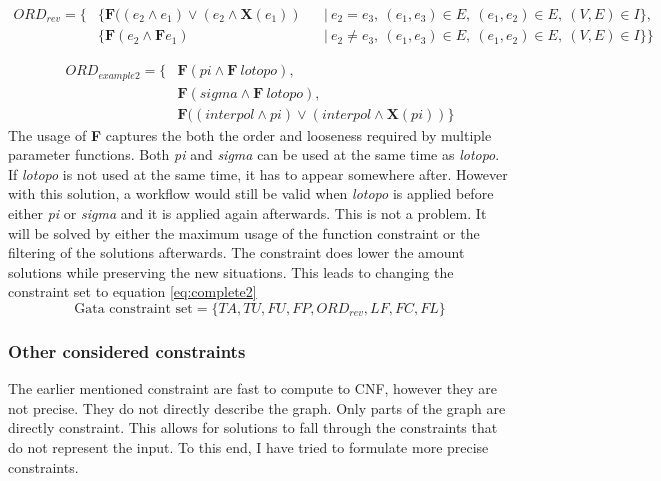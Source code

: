 \documentclass{article}
\begin{document}
\begin{align*}
        ORD_{rev} =\{& \{\textbf{F}((e_2 \wedge e_1) \vee (e_2 \wedge \textbf{X} (e_1)  )&  &|\ e_2 = e_3,\ (e_1,e_3) \in  E ,\ (e_1,e_2) \in  E ,\ (V,E) \in  I  \}, \\
        &\{\textbf{F}(e_2 \wedge \textbf{F} e_1) &  &|\ e_2 \not= e_3,\ (e_1,e_3) \in  E ,\ (e_1,e_2) \in  E,\    (V,E) \in I\}\}
\end{align*}

\begin{align*}
    ORD_{example2} = \{& \textbf{F}(pi \wedge \textbf{F}\ lotopo), \\
    & \textbf{F}(sigma \wedge \textbf{F}\ lotopo), \\
    &\textbf{F}((interpol \wedge pi) \vee (interpol \wedge \textbf{X} (pi)  ) 
    \}
\end{align*}
The usage of \textbf{F} captures the both the order and looseness required by multiple parameter functions. Both \textit{pi} and \textit{sigma} can be used at the same time as \textit{lotopo}. If \textit{lotopo} is not used at the same time, it has to appear somewhere after. However with this solution, a workflow would still be valid when \textit{lotopo} is applied before either \textit{pi} or \textit{sigma} and it is applied again afterwards. This is not a problem. It will be solved by either the maximum usage of the function constraint or the filtering of the solutions afterwards. The constraint does lower the amount solutions while preserving the new situations. This leads to changing the constraint set to equation \ref{eq:complete2}
\begin{equation}
 \text{Gata constraint set}= \{TA, TU, FU, FP, ORD_{rev}, LF, FC,FL\} \label{eq:complete2}
\end{equation}
 
 




\subsubsection{Other considered constraints}
The earlier mentioned constraint are fast to compute to CNF, however they are not precise. They do not directly describe the graph. Only parts of the graph are directly constraint. This allows for solutions to fall through the constraints that do not represent the input. To this end, I have tried to formulate more precise constraints. \\
\end{document}
